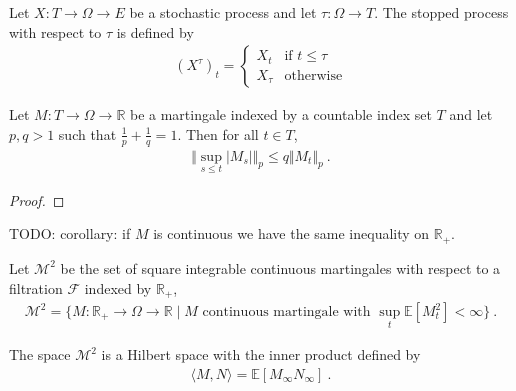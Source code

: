 \begin{definition}\label{def:stoppedProcess}
  \mathlibok
Let $X : T \to \Omega \to E$ be a stochastic process and let $\tau : \Omega \to T$.
The stopped process with respect to $\tau$ is defined by
\begin{align*}
  (X^{\tau})_t = \begin{cases}
    X_t & \text{if } t \le \tau \\
    X_{\tau} & \text{otherwise}
  \end{cases}
\end{align*}
\end{definition}


\begin{theorem}\label{thm:doob_lp}
Let $M : T \to \Omega \to \mathbb{R}$ be a martingale indexed by a countable index set $T$ and let $p, q > 1$ such that $\frac{1}{p} + \frac{1}{q} = 1$.
Then for all $t \in T$,
\begin{align*}
  \Vert \sup_{s \le t} \vert M_s \vert \Vert_p
  \le q \Vert M_t \Vert_p
  \: .
\end{align*}
\end{theorem}

\begin{proof}

\end{proof}

TODO: corollary: if $M$ is continuous we have the same inequality on $\mathbb{R}_+$.


\begin{definition}\label{def:squareIntegrableMartingales}
Let $\mathcal{M}^2$ be the set of square integrable continuous martingales with respect to a filtration $\mathcal{F}$ indexed by $\mathbb{R}_+$,
\begin{align*}
  \mathcal{M}^2
  = \{ M : \mathbb{R}_+ \to \Omega \to \mathbb{R} \mid M \text{ continuous martingale with } \sup_{t}\mathbb{E}[M_t^2] < \infty \}
  \: .
\end{align*}
\end{definition}


\begin{theorem}\label{thm:hilbertSpace_squareIntegrableMartingales}
The space $\mathcal{M}^2$ is a Hilbert space with the inner product defined by
\begin{align*}
  \langle M, N \rangle = \mathbb{E}[M_\infty N_\infty]
  \: .
\end{align*}
\end{theorem}

